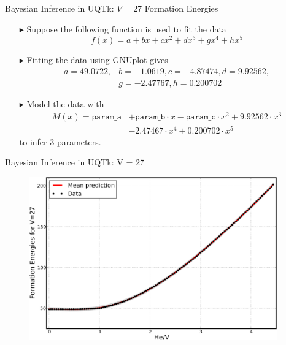 \documentclass[10pt]{beamer}
\begin{document}
\begin{frame}{Bayesian Inference in UQTk: $V = 27$ Formation Energies}
	\large
	    \begin{itemize}
    	\item[$\blacktriangleright$] Suppose the following function is used to fit
    	the data 
    	$$f(x) = a + b x + c x^2 + d x^3 + g x^4 + h x^5$$
    	\item[$\blacktriangleright$] Fitting the data using GNUplot gives
    	\begin{align*}
    	a = 49.0722, &b = -1.0619, c = -4.87474, d = 9.92562, \\
    	&g = -2.47767, h = 0.200702
    	\end{align*}
    	\item[$\blacktriangleright$] Model the data with
    	\begin{align*}
    	M(x) = \texttt{param\_a} &+ \texttt{param\_b} \cdot x - \texttt{param\_c}
    	\cdot x^2 + 9.92562 \cdot x^3 \\
    	 &- 2.47467 \cdot x^4 + 0.200702 \cdot x^5
    	\end{align*}
    	to infer 3 parameters.
    \end{itemize}
\end{frame}

\begin{frame}{Bayesian Inference in UQTk: V = 27}
     \begin{figure}
         \includegraphics[width=0.95\textwidth]{V27_postpred}
     \end{figure}
\end{frame}
\end{document}
